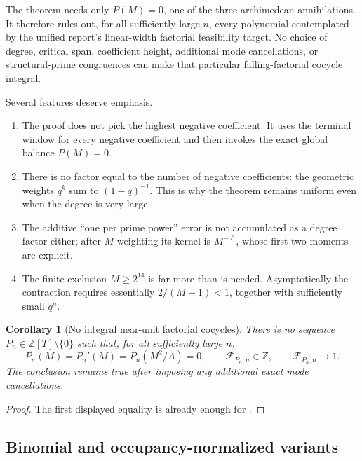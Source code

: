 \documentclass[11pt,oneside]{article}
\newtheorem{corollary}[theorem]{Corollary}
\theoremstyle{definition}
\theoremstyle{remark}
\newcommand{\Z}{\mathbb Z}
\newcommand{\FF}{\mathcal F}
\begin{document}
\begin{newresult}
The theorem needs only $P(M)=0$, one of the three archimedean annihilations.  It therefore
rules out, for all sufficiently large $n$, every polynomial contemplated by the unified
report's linear-width factorial feasibility target.  No choice of degree, critical span,
coefficient height, additional mode cancellations, or structural-prime congruences can make
that particular falling-factorial cocycle integral.
\end{newresult}

Several features deserve emphasis.

\begin{enumerate}[label=(\roman*)]
\item The proof does not pick the highest negative coefficient.  It uses the terminal window
for every negative coefficient and then invokes the exact global balance $P(M)=0$.
\item There is no factor equal to the number of negative coefficients: the geometric weights
$q^k$ sum to $(1-q)^{-1}$.  This is why the theorem remains uniform even when the degree is
very large.
\item The additive ``one per prime power'' error is not accumulated as a degree factor either;
after $M$-weighting its kernel is $M^{-\ell}$, whose first two moments are explicit.
\item The finite exclusion $M\ge2^{14}$ is far more than is needed.  Asymptotically the
contraction requires essentially $2/(M-1)<1$, together with sufficiently small $q^n$.
\end{enumerate}

\begin{corollary}[No integral near-unit factorial cocycles]
\label{cor:no-factorial-near-unit}
There is no sequence $P_n\in\Z[T]\setminus\{0\}$ such that, for all sufficiently large $n$,
\[
 P_n(M)=P_n'(M)=P_n(M^2/A)=0,
 \qquad \FF_{P_n,n}\in\Z,
 \qquad \FF_{P_n,n}\longrightarrow1.
\]
The conclusion remains true after imposing any additional exact mode cancellations.
\end{corollary}

\begin{proof}
The first displayed equality is already enough for .
\end{proof}

\subsection{Binomial and occupancy-normalized variants}
\end{document}
